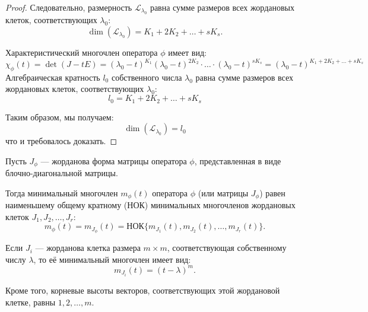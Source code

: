 \begin{proof}
Следовательно, размерность $\mathcal{L}_{\lambda_{0}}$ равна сумме размеров всех жордановых клеток, соответствующих $\lambda_{0}$:
\[
\dim(\mathcal{L}_{\lambda_{0}}) = K_{1} + 2K_{2} + \ldots + sK_{s}.
\]

Характеристический многочлен оператора $\phi$ имеет вид:
\[
\chi_{\phi}(t) = \det(J - tE) = (\lambda_{0} - t)^{K_{1}} (\lambda_{0} - t)^{2 K_{2}} \cdot \ldots \cdot (\lambda_{0} - t)^{s K_{s}} = (\lambda_{0} - t)^{K_{1} + 2K_{2} + \ldots + sK_{s}}
\]
Алгебраическая кратность $l_{0}$ собственного числа $\lambda_{0}$ равна сумме размеров всех жордановых клеток, соответствующих $\lambda_{0}$:
\[
l_{0} = K_{1} + 2K_{2} + \ldots + sK_{s}
\]

Таким образом, мы получаем:
\[
\dim(\mathcal{L}_{\lambda_{0}}) = l_{0}
\]
что и требовалось доказать.
\end{proof}

\vspace{0.2cm}

\begin{shth}
    \begin{theorem}
        \leavevmode \nl 
        
        Пусть \( J_{\phi} \) — жорданова форма матрицы оператора \(\phi\), представленная в виде блочно-диагональной матрицы.
        
    Тогда минимальный многочлен \( m_{\phi}(t) \) оператора \(\phi\) (или матрицы \( J_{\phi} \)) равен \\наименьшему общему кратному (НОК) минимальных многочленов жордановых клеток \( J_{1}, J_{2}, \ldots, J_{r} \):
    \[
    m_{\phi}(t) = m_{J_{\phi}}(t) = \text{НОК}\{m_{J_{1}}(t), m_{J_{2}}(t), \ldots, m_{J_{r}}(t)\}.
    \]

    Если \( J_{i} \) — жорданова клетка размера \( m \times m \), соответствующая собственному числу \(\lambda\), то её минимальный многочлен имеет вид:
    \[
    m_{J_{i}}(t) = (t - \lambda)^m.
    \]

    Кроме того, корневые высоты векторов, соответствующих этой жордановой клетке, равны \( 1, 2, \ldots, m \).
    \end{theorem}
\end{shth}

